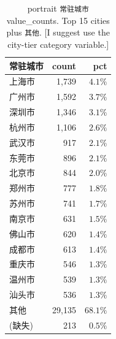 \documentclass[11pt,letterpaper,english,final]{article}
\begin{document}
\begin{table}[H]
\centering
\small
\setlength{\tabcolsep}{6pt}
\caption{portrait \texttt{常驻城市} value\_counts. Top 15 cities plus \texttt{其他}. {\color{cyan}[I suggest use the city-tier category variable.]}}
\label{tab:city}
\begin{tabular}{@{}l r r@{}}
\toprule
{常驻城市} & {count} & {pct} \\
\midrule
上海市   & 1{,}739 & $4.1\%$  \\
广州市   & 1{,}592 & $3.7\%$  \\
深圳市   & 1{,}346 & $3.1\%$  \\
杭州市   & 1{,}106 & $2.6\%$  \\
武汉市   & 917    & $2.1\%$  \\
东莞市   & 896    & $2.1\%$  \\
北京市   & 844    & $2.0\%$  \\
郑州市   & 777    & $1.8\%$  \\
苏州市   & 741    & $1.7\%$  \\
南京市   & 631    & $1.5\%$  \\
佛山市   & 620    & $1.4\%$  \\
成都市   & 613    & $1.4\%$  \\
重庆市   & 546    & $1.3\%$  \\
温州市   & 539    & $1.3\%$  \\
汕头市   & 536    & $1.3\%$  \\
其他     & 29{,}135 & $68.1\%$ \\
\midrule
(缺失)   & 213    & $0.5\%$ \\
\bottomrule
\end{tabular}
\end{table}
\end{document}
